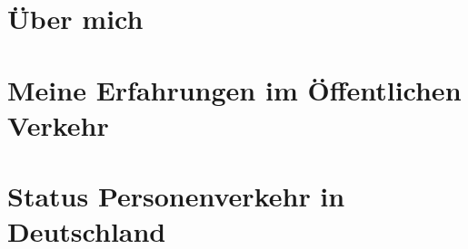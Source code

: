 \documentclass{beamer}
\begin{document}
\begin{frame}
  \titlepage
\end{frame}


\section{Über mich}



\section{Meine Erfahrungen im Öffentlichen Verkehr}





\section{Status Personenverkehr in Deutschland}





\bgroup

\end{document}
